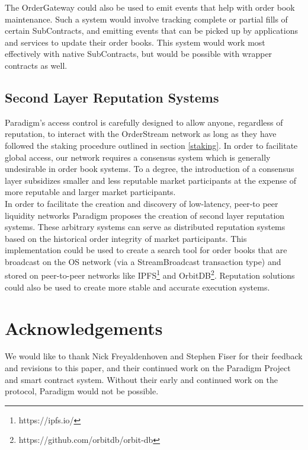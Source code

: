\documentclass[9pt]{article}
\begin{document}
\noindent The OrderGateway could also be used to emit events that help with order book maintenance. Such a system would involve tracking complete or partial fills of certain SubContracts, and emitting events that can be picked up by applications and services to update their order books. This system would work most effectively with native SubContracts, but would be possible with wrapper contracts as well.

\subsection{Second Layer Reputation Systems}
\noindent Paradigm’s access control is carefully designed to allow anyone, regardless of reputation, to interact with the OrderStream network as long as they have followed the staking procedure outlined in section \ref{staking}. In order to facilitate global access, our network requires a consensus system which is generally undesirable in order book systems. To a degree, the introduction of a consensus layer subsidizes smaller and less reputable market participants at the expense of more reputable and larger market participants. \\ 

\noindent In order to facilitate the creation and discovery of low-latency, peer-to peer liquidity networks Paradigm proposes the creation of second layer reputation systems. These arbitrary systems can serve as distributed reputation systems based on the historical order integrity of market participants. This implementation could be used to create a search tool for order books that are broadcast on the OS network (via a StreamBroadcast transaction type) and stored on peer-to-peer networks like IPFS\footnote{https://ipfs.io/} and OrbitDB\footnote{https://github.com/orbitdb/orbit-db}. Reputation solutions could also be used to create more stable and accurate execution systems.

\clearpage
\pagebreak


\section{Acknowledgements}\label{acknowledgements}
\noindent We would like to thank Nick Freyaldenhoven and Stephen Fiser for their feedback and revisions to this paper, and their continued work on the Paradigm Project and smart contract system. Without their early and continued work on the protocol, Paradigm would not be possible. \\ 
\end{document}
